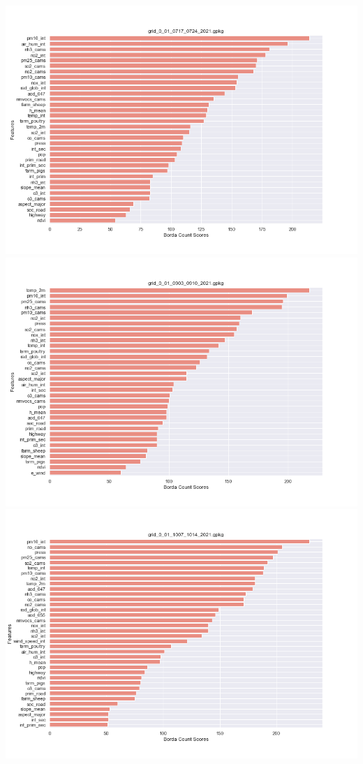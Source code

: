 \begin{center}
\includegraphics[width=.9\textwidth]{images/fs_results/pm25/001/montains/grid_0_01_0717_0724_2021.png}
\includegraphics[width=.9\textwidth]{images/fs_results/pm25/001/montains/grid_0_01_0903_0910_2021.png}
\includegraphics[width=.9\textwidth]{images/fs_results/pm25/001/montains/grid_0_01_1007_1014_2021.png}
\end{center}

